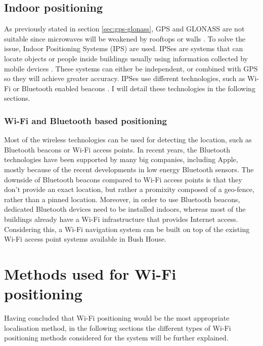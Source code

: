 \subsection{Indoor positioning}
\label{sec:indoor-positioning}

As previously stated in section \ref{sec:gps-glonass}, GPS and GLONASS are not suitable since microwaves will be weakened by rooftops or walls
\cite{gps-indoor-precision}. To solve the issue, Indoor Positioning Systems (IPS) are used. IPSes are systems that can locate objects or people inside buildings usually using information collected by mobile devices \cite{ips-definition}. These systems can either be independent, or combined with GPS so they will achieve greater accuracy. IPSes use different technologies, such as Wi-Fi or Bluetooth enabled beacons \cite{ips-definition}. I will detail these technologies in the following sections.

\subsubsection{Wi-Fi and Bluetooth based positioning}
\label{sec:wifi-positioning}

Most of the wireless technologies can be used for detecting the location, such as Bluetooth beacons or Wi-Fi access points. In recent years, the Bluetooth technologies have been supported by many big companies, including Apple, mostly because of the recent developments in low energy Bluetooth sensors. The downside of Bluetooth beacons compared to Wi-Fi access points is that they don't provide an exact location, but rather a promixity composed of a geo-fence, rather than a pinned location. Moreover, in order to use Bluetooth beacons, dedicated Bluetooth devices need to be installed indoors, whereas most of the buildings already have a Wi-Fi infrastructure that provides Internet access. Considering this, a Wi-Fi navigation system can be built on top of the existing Wi-Fi access point systems available in Bush House.

\section{Methods used for Wi-Fi positioning}
\label{sec:methods-wifi-pos}
Having concluded that Wi-Fi positioning would be the most appropriate localisation method, in the following sections the different types of Wi-Fi positioning methods considered for the system will be further explained.


